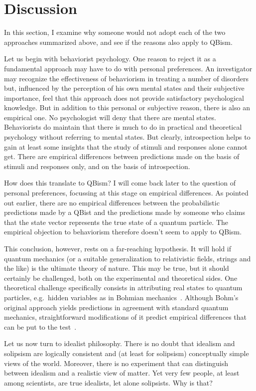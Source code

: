 \documentclass[12pt]{article}
\begin{document}
\section{Discussion\label{S4}}
%
In this section, I examine why someone
would not adopt each of the two approaches
summarized above, and see if the
reasons also apply to QBism.

Let us begin with behaviorist psychology.
One reason to reject it as a fundamental
approach may have to do with personal
preferences.  An investigator may
recognize the effectiveness of behaviorism
in treating a number of disorders but,
influenced by the perception of his own
mental states and their subjective
importance, feel that this approach does
not provide satisfactory psychological
knowledge.  But in addition to this
personal or subjective reason, there is
also an empirical one.
No psychologist will deny that
there are mental states.  Behaviorists do
maintain that there is much to do
in practical and theoretical psychology
without referring to mental states.
But clearly, introspection helps to gain
at least some insights that the study of
stimuli and responses alone cannot get.
There are empirical differences between
predictions made on the basis of
stimuli and responses only, and on
the basis of introspection.

How does this translate to QBism?
I will come back later to the question
of personal preferences, focussing at
this stage on empirical differences.
As pointed out earlier, there are no
empirical differences between the
probabilistic predictions made by a
QBist and the predictions made by
someone who claims that the state vector
represents the true state of a quantum
particle.  The empirical objection
to behaviorism therefore doesn't seem to
apply to QBism.

This conclusion, however, rests on a
far-reaching hypothesis.  It will hold if
quantum mechanics (or a suitable generalization
to relativistic fields, strings and the like)
is the ultimate theory of nature.  This may
be true, but it should certainly be
challenged, both on the experimental and
theoretical sides.  One theoretical
challenge specifically consists in
attributing real states to quantum particles,
e.g.\ hidden variables as in Bohmian
mechanics~\cite{bohm}.  Although Bohm's
original approach yields predictions in
agreement with standard quantum mechanics,
straightforward modifications of it
predict empirical differences that can
be put to the test~\cite{valentini}.

Let us now turn to idealist philosophy.
There is no doubt that idealism and
solipsism are logically consistent and
(at least for solipsism) conceptually
simple views of the world.  Moreover, there
is no experiment that can distinguish
between idealism and a realistic view
of matter.  Yet very few people, at least
among scientists, are true idealists, let
alone solipsists.  Why is that?
\end{document}

